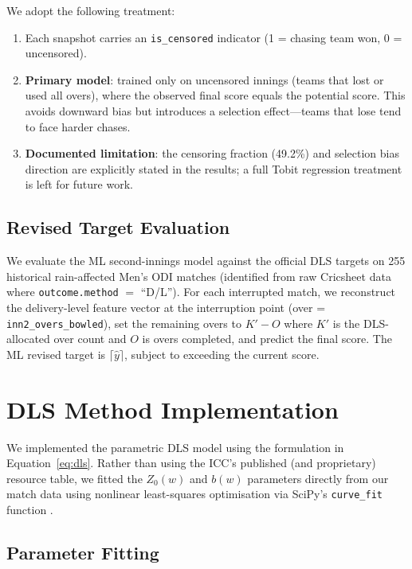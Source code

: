 \documentclass[12pt,a4paper,oneside]{report}
\begin{document}
We adopt the following treatment:
\begin{enumerate}[nosep]
    \item Each snapshot carries an \texttt{is\_censored} indicator (1 = chasing team won, 0 = uncensored).
    \item \textbf{Primary model}: trained only on uncensored innings (teams that lost or used all overs), where the observed final score equals the potential score.  This avoids downward bias but introduces a selection effect---teams that lose tend to face harder chases.
    \item \textbf{Documented limitation}: the censoring fraction (49.2\%) and selection bias direction are explicitly stated in the results; a full Tobit regression treatment is left for future work.
\end{enumerate}

\subsection{Revised Target Evaluation}

We evaluate the ML second-innings model against the official DLS targets on 255 historical rain-affected Men's ODI matches (identified from raw Cricsheet data where \texttt{outcome.method} $=$ ``D/L'').  For each interrupted match, we reconstruct the delivery-level feature vector at the interruption point (over = \texttt{inn2\_overs\_bowled}), set the remaining overs to $K' - O$ where $K'$ is the DLS-allocated over count and $O$ is overs completed, and predict the final score.  The ML revised target is $\lceil \hat{y} \rceil$, subject to exceeding the current score.

\section{DLS Method Implementation}
\label{sec:dls_implementation}

We implemented the parametric DLS model using the formulation in Equation~\ref{eq:dls}. Rather than using the ICC's published (and proprietary) resource table, we fitted the $Z_0(w)$ and $b(w)$ parameters directly from our match data using nonlinear least-squares optimisation via SciPy's \texttt{curve\_fit} function \citep{scipy}.

\subsection{Parameter Fitting}
\end{document}
